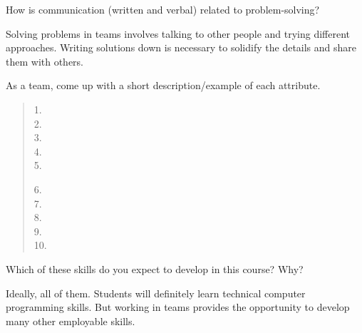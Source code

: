 \Q How is communication (written and verbal) related to problem-solving?

\begin{answer}[3em]
Solving problems in teams involves talking to other people and trying different approaches.
Writing solutions down is necessary to solidify the details and share them with others.
\end{answer}


\Q As a team, come up with a short description/example of each attribute.

\begin{quote}
\begin{multicols}{2}
1.  \\[1ex]
2.  \\[1ex]
3.  \\[1ex]
4.  \\[1ex]
5. 

6.  \\[1ex]
7.  \\[1ex]
8.  \\[1ex]
9.  \\[1ex]
10. 
\end{multicols}
\end{quote}


\Q Which of these skills do you expect to develop in this course? Why?

\begin{answer}[3em]
Ideally, all of them. Students will definitely learn technical computer programming skills.
But working in teams provides the opportunity to develop many other employable skills.
\end{answer}
